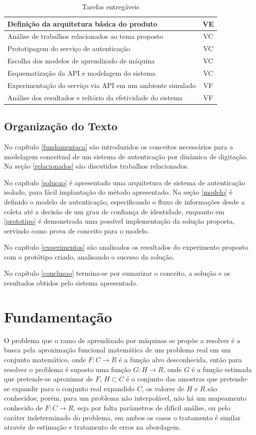 \documentclass[pfc]{imetex}
\begin{document}
\begin{table}[htb]
\begin{tabular}{|l|c|}
\hline
Definição da arquitetura básica do produto & VE\\
\hline
Análise de trabalhos relacionados ao tema proposto & VC\\
\hline
Prototipagem do serviço de autenticação & VC\\
\hline
Escolha dos modelos de aprendizado de máquina & VC\\
\hline
Esquematização da API e modelagem do sistema & VC\\
\hline
Experimentação do serviço via API em um ambiente simulado & VF\\
\hline
Análise dos resultados e reltório da efetividade do sistema & VF\\
\hline
\end{tabular}

\caption{Tarefas entregáveis}
\end{table}


\section{Organização do Texto}
No capítulo \ref{fundamentaca} são introduzidos os conceitos necessários para a modelagem conceitual de um sistema de autenticação por dinâmica de digitação. Na seção \ref{relacionados} são discutidos trabalhos relacionados.

No capítulo \ref{solucao} é apresentado uma arquitetura de sistema de autenticação isolado, para fácil implantação do método apresentado. Na seção \ref{modelo} é definido o modelo de autenticação, especificando o fluxo de informações desde a coleta até a decisão de um grau de confiança de identidade, enquanto em \ref{prototipo} é demonstrada uma possível implementação da solução proposta, servindo como prova de conceito para o modelo.

No capítulo \ref{experimentos} são analisados os resultados do experimento proposto com o protótipo criado, analisando o sucesso da solução.

No capítulo \ref{conclusao} termina-se por sumarizar o conceito, a solução e os resultados obtidos pelo sistema apresentado.

\chapter{Fundamentação}
   O problema que o ramo de aprendizado por máquinas se propõe a resolver é a busca pela aproximação funcional matemática de um problema real em um conjunto matemático, onde $F:C \rightarrow R$ é a função alvo desconhecida, então para resolver o problema é suposto uma função $G:H \rightarrow R$, onde $G$ é a função estimada que pretende-se aproximar de $F$, $H \subset C$ é o conjunto das amostras que pretende-se expandir para o conjunto real expandido $C$, os valores de $H$ e $R$ são conhecidos; porém, para um problema não interpolável, não há um mapeamento conhecido de $F:C \rightarrow R$, seja por falta parâmetros de difícil análise, ou pelo caráter indeterminado do problema, em ambos os casos o tratamento é similar atravéz de estimação e tratamento de erros na abordagem.
\end{document}
